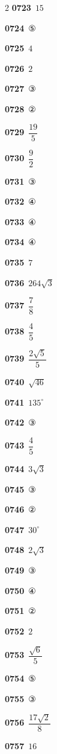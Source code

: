 \documentclass[10pt,a4paper]{article}
\begin{document}
\begin{multicols}{2}
\noindent\textbf{0723}\ $15$\par
\noindent\textbf{0724}\ ⑤\par
\noindent\textbf{0725}\ $4$\par
\noindent\textbf{0726}\ $2$\par
\noindent\textbf{0727}\ ③\par
\noindent\textbf{0728}\ ②\par
\noindent\textbf{0729}\ $\dfrac{19}{5}$\par
\noindent\textbf{0730}\ $\dfrac{9}{2}$\par
\noindent\textbf{0731}\ ③\par
\noindent\textbf{0732}\ ④\par
\noindent\textbf{0733}\ ④\par
\noindent\textbf{0734}\ ④\par
\noindent\textbf{0735}\ $7$\par
\noindent\textbf{0736}\ $264\sqrt{3}$\par
\noindent\textbf{0737}\ $\dfrac{7}{8}$\par
\noindent\textbf{0738}\ $\dfrac{4}{5}$\par
\noindent\textbf{0739}\ $\dfrac{2\sqrt{5}}{5}$\par
\noindent\textbf{0740}\ $\sqrt{46}$\par
\noindent\textbf{0741}\ $135^\circ$\par
\noindent\textbf{0742}\ ③\par
\noindent\textbf{0743}\ $\dfrac{4}{5}$\par
\noindent\textbf{0744}\ $3\sqrt{3}$\par
\noindent\textbf{0745}\ ③\par
\noindent\textbf{0746}\ ②\par
\noindent\textbf{0747}\ $30^\circ$\par
\noindent\textbf{0748}\ $2\sqrt{3}$\par
\noindent\textbf{0749}\ ③\par
\noindent\textbf{0750}\ ④\par
\noindent\textbf{0751}\ ②\par
\noindent\textbf{0752}\ $2$\par
\noindent\textbf{0753}\ $\dfrac{\sqrt{6}}{5}$\par
\noindent\textbf{0754}\ ⑤\par
\noindent\textbf{0755}\ ③\par
\noindent\textbf{0756}\ $\dfrac{17\sqrt{2}}{8}$\par
\noindent\textbf{0757}\ $16$\par

\end{multicols}
\end{document}
